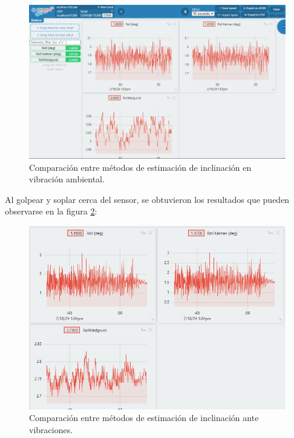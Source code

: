  \begin{figure}[H]
    \centering
    \includegraphics[width = \textwidth]{imagenes/cap3_resultados/Pruebas ACL/Inclinacion/PruebaInclinacion.png}
    \caption{Comparación entre métodos de estimación de inclinación en vibración ambiental.}
    \label{fig:pruebasinclinacion}
\end{figure}

Al golpear y soplar cerca del sensor, se obtuvieron los resultados que pueden observarse en la figura \ref{fig:pruebasinclinacion2}:

\begin{figure}[H]
    \centering
    \includegraphics[width = \textwidth]{imagenes/cap3_resultados/Pruebas ACL/Inclinacion/Comparacion M1 M2 M3 (Maggwick) ante vibraciones.png}
    \caption{Comparación entre métodos de estimación de inclinación ante vibraciones.}
    \label{fig:pruebasinclinacion2}
\end{figure}


